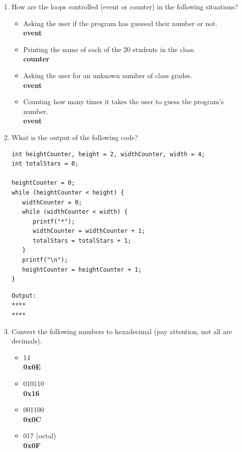 \documentclass[letter,11pt]{article}
\begin{document}
\begin{enumerate}
    \item How are the loops controlled (event or counter) in the following situations?
    \begin{itemize}
        \item Asking the user if the program has guessed their number or not. \\
            \textbf{event}
        \item Printing the name of each of the 20 students in the class. \\
            \textbf{counter}
        \item Asking the user for an unknown number of class grades. \\
            \textbf{event}
        \item Counting how many times it takes the user to guess the program's number. \\
            \textbf{event}
    \end{itemize}
    
    \item What is the output of the following code?
    \begin{verbatim}
int heightCounter, height = 2, widthCounter, width = 4;
int totalStars = 0;

heightCounter = 0;
while (heightCounter < height) {
   widthCounter = 0;
   while (widthCounter < width) {
      printf("*");
      widthCounter = widthCounter + 1;
      totalStars = totalStars + 1;
   }
   printf("\n");
   heightCounter = heightCounter + 1;
}
    \end{verbatim}
    \begin{verbatim}
Output:
****
****
    \end{verbatim}
    
    \item Convert the following numbers to hexadecimal (pay attention, not all are decimals).
    \begin{itemize}
        \item 14 \\
            \textbf{0x0E}
        \item 010110 \\
            \textbf{0x16}
        \item 001100 \\
            \textbf{0x0C}
        \item 017 (octal) \\
            \textbf{0x0F}
    \end{itemize}
\end{enumerate}
\end{document}
